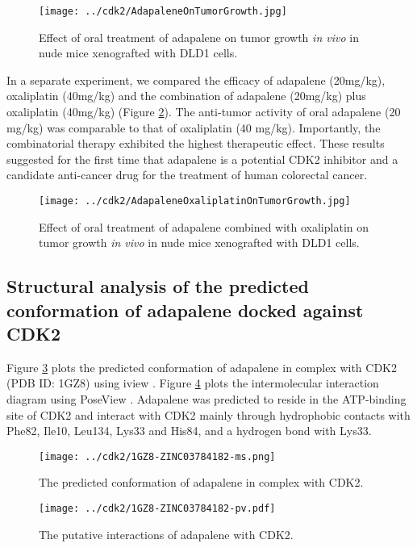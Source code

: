 \begin{figure}
\centering
\texttt{[image: ../cdk2/AdapaleneOnTumorGrowth.jpg]}
\caption{Effect of oral treatment of adapalene on tumor growth \textit{in vivo} in nude mice xenografted with DLD1 cells.}
\label{cdk2:AdapaleneOnTumorGrowth}
\end{figure}

In a separate experiment, we compared the efficacy of adapalene (20mg/kg), oxaliplatin (40mg/kg) and the combination of adapalene (20mg/kg) plus oxaliplatin (40mg/kg) (Figure \ref{cdk2:AdapaleneOxaliplatinOnTumorGrowth}). The anti-tumor activity of oral adapalene (20 mg/kg) was comparable to that of oxaliplatin (40 mg/kg). Importantly, the combinatorial therapy exhibited the highest therapeutic effect. These results suggested for the first time that adapalene is a potential CDK2 inhibitor and a candidate anti-cancer drug for the treatment of human colorectal cancer.

\begin{figure}
\centering
\texttt{[image: ../cdk2/AdapaleneOxaliplatinOnTumorGrowth.jpg]}
\caption{Effect of oral treatment of adapalene combined with oxaliplatin on tumor growth \textit{in vivo} in nude mice xenografted with DLD1 cells.}
\label{cdk2:AdapaleneOxaliplatinOnTumorGrowth}
\end{figure}

\subsection{Structural analysis of the predicted conformation of adapalene docked against CDK2}

Figure \ref{cdk2:1GZ8-ZINC03784182-ms} plots the predicted conformation of adapalene in complex with CDK2 (PDB ID: 1GZ8) using iview \citep{1366}. Figure \ref{cdk2:1GZ8-ZINC03784182-pv} plots the intermolecular interaction diagram using PoseView \citep{748}. Adapalene was predicted to reside in the ATP-binding site of CDK2 and interact with CDK2 mainly through hydrophobic contacts with Phe82, Ile10, Leu134, Lys33 and His84, and a hydrogen bond with Lys33.

\begin{figure}
\centering
\texttt{[image: ../cdk2/1GZ8-ZINC03784182-ms.png]}
\caption{The predicted conformation of adapalene in complex with CDK2.}
\label{cdk2:1GZ8-ZINC03784182-ms}
\end{figure}

\begin{figure}
\centering
\texttt{[image: ../cdk2/1GZ8-ZINC03784182-pv.pdf]}
\caption{The putative interactions of adapalene with CDK2.}
\label{cdk2:1GZ8-ZINC03784182-pv}
\end{figure}

